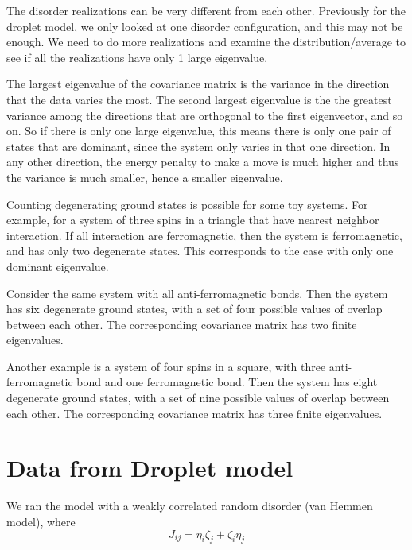 The disorder realizations can be very different from each other. 
Previously for the droplet model,
we only looked at one disorder configuration, and this may not be enough. 
We need to do more realizations and examine the distribution/average to see
if all the realizations have only 1 large eigenvalue. 

The largest eigenvalue of the covariance matrix is the variance in the 
direction that the data varies the most. The second largest eigenvalue is the 
the greatest variance among the directions that are orthogonal 
to the first eigenvector, and so on. So if there is only one large eigenvalue,
this means there is only one pair of states that are dominant, since the system
only varies in that one direction. In any other direction, the energy penalty 
to make a move is much higher and thus the variance is much smaller, hence 
a smaller eigenvalue.

Counting degenerating ground states is possible for some toy systems. 
For example, for a system of three spins in a triangle that have nearest 
neighbor interaction. If all interaction are ferromagnetic, then the system is
ferromagnetic, and has only two degenerate states. This corresponds to the 
case with only one dominant eigenvalue.


Consider the same system with all anti-ferromagnetic bonds. Then the system has
six degenerate ground states, with a set of four possible values of 
overlap between each other. The corresponding covariance matrix has two finite 
eigenvalues. 

Another example is a system of four spins in a square, with three 
anti-ferromagnetic bond and one ferromagnetic bond.
Then the system has eight degenerate ground states, with a set of nine possible 
values of overlap between each other. The corresponding covariance matrix has 
three finite eigenvalues. 



\section{Data from Droplet model}
We ran the model with a weakly correlated random disorder (van Hemmen model),
where
\[
J_{ij}=\eta_i\zeta_j+\zeta_i\eta_j
\]

